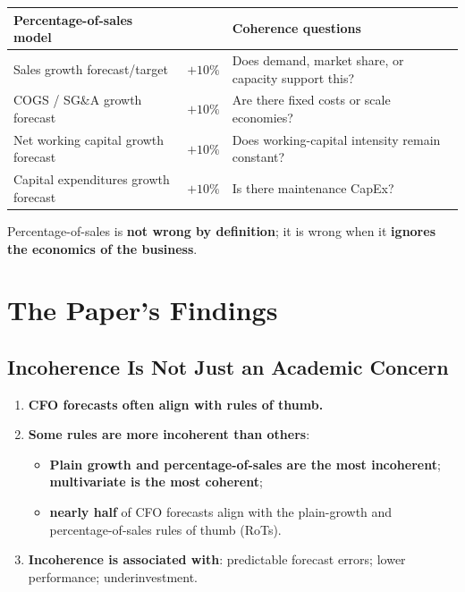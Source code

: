 \begin{center}
\small
\begin{tabular}{@{}lcl@{}}
\toprule
\textbf{Percentage-of-sales model} & & \textbf{Coherence questions}\\
\midrule
Sales growth forecast/target & $+10\%$ & Does demand, market share, or capacity support this?\\
COGS / SG\&A growth forecast & $+10\%$ & Are there fixed costs or scale economies?\\
Net working capital growth forecast & $+10\%$ & Does working-capital intensity remain constant?\\
Capital expenditures growth forecast & $+10\%$ & Is there maintenance CapEx?\\
\bottomrule
\end{tabular}
\end{center}
\begin{keybox}
Percentage-of-sales is \textbf{not wrong by definition}; it is wrong when it \textbf{ignores the economics of the business}.
\end{keybox}

\section{The Paper's Findings}

\subsection{Incoherence Is Not Just an Academic Concern}

\begin{enumerate}
  \item \textbf{CFO forecasts often align with rules of thumb.}
  \item \textbf{Some rules are more incoherent than others}:
  \begin{itemize}
    \item \textbf{Plain growth and percentage-of-sales are the most incoherent}; \textbf{multivariate is the most coherent};
    \item \textbf{nearly half} of CFO forecasts align with the plain-growth and percentage-of-sales rules of thumb (RoTs).
  \end{itemize}
  \item \textbf{Incoherence is associated with}: predictable forecast errors; lower performance; underinvestment.
\end{enumerate}

